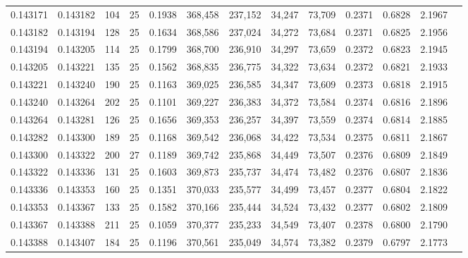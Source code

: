 \begin{tabular}{rrrrrrrrrrrrr}
0.143171 & 0.143182 &   104 &  25 &                                     0.1938 & 368,458 & 237,152 &  34,247 &  73,709 & 0.2371 & 0.6828 & 2.1967 \\
0.143182 & 0.143194 &   128 &  25 &                                     0.1634 & 368,586 & 237,024 &  34,272 &  73,684 & 0.2371 & 0.6825 & 2.1956 \\
0.143194 & 0.143205 &   114 &  25 &                                     0.1799 & 368,700 & 236,910 &  34,297 &  73,659 & 0.2372 & 0.6823 & 2.1945 \\
0.143205 & 0.143221 &   135 &  25 &                                     0.1562 & 368,835 & 236,775 &  34,322 &  73,634 & 0.2372 & 0.6821 & 2.1933 \\
0.143221 & 0.143240 &   190 &  25 &                                     0.1163 & 369,025 & 236,585 &  34,347 &  73,609 & 0.2373 & 0.6818 & 2.1915 \\
0.143240 & 0.143264 &   202 &  25 &                                     0.1101 & 369,227 & 236,383 &  34,372 &  73,584 & 0.2374 & 0.6816 & 2.1896 \\
0.143264 & 0.143281 &   126 &  25 &                                     0.1656 & 369,353 & 236,257 &  34,397 &  73,559 & 0.2374 & 0.6814 & 2.1885 \\
0.143282 & 0.143300 &   189 &  25 &                                     0.1168 & 369,542 & 236,068 &  34,422 &  73,534 & 0.2375 & 0.6811 & 2.1867 \\
0.143300 & 0.143322 &   200 &  27 &                                     0.1189 & 369,742 & 235,868 &  34,449 &  73,507 & 0.2376 & 0.6809 & 2.1849 \\
0.143322 & 0.143336 &   131 &  25 &                                     0.1603 & 369,873 & 235,737 &  34,474 &  73,482 & 0.2376 & 0.6807 & 2.1836 \\
0.143336 & 0.143353 &   160 &  25 &                                     0.1351 & 370,033 & 235,577 &  34,499 &  73,457 & 0.2377 & 0.6804 & 2.1822 \\
0.143353 & 0.143367 &   133 &  25 &                                     0.1582 & 370,166 & 235,444 &  34,524 &  73,432 & 0.2377 & 0.6802 & 2.1809 \\
0.143367 & 0.143388 &   211 &  25 &                                     0.1059 & 370,377 & 235,233 &  34,549 &  73,407 & 0.2378 & 0.6800 & 2.1790 \\
0.143388 & 0.143407 &   184 &  25 &                                     0.1196 & 370,561 & 235,049 &  34,574 &  73,382 & 0.2379 & 0.6797 & 2.1773 \\

\end{tabular}
